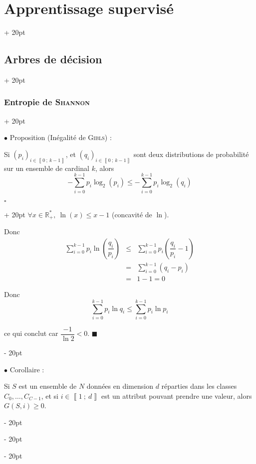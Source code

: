 \documentclass[a4paper, 12pt, twoside]{article}
\newcommand{\R}{\mathbb{R}} %
\newcommand{\nset}[2]{\left\llbracket #1\ ;\ #2 \right\rrbracket}
\newcommand{\lr}[1]{\left( #1 \right)}
\renewcommand{\le}{\leqslant}
\renewcommand{\ge}{\geqslant}
\newcommand{\ind}[1][20pt]{\advance\leftskip + #1}
\newcommand{\deind}[1][20pt]{\advance\leftskip - #1}
\newenvironment{indt}[2][20pt]{#2 \par \ind[#1]}{\par \deind} %
\newenvironment{proof}[1][{}]{\begin{indt}{$\square$ #1}}{$\blacksquare$ \end{indt}}
\begin{document}
\begin{indt}{\section{Apprentissage supervisé}}
\begin{indt}{\subsection{Arbres de décision}}
\begin{indt}{\subsubsection{Entropie de \textsc{Shannon}}}
                \vspace{12pt}
                
                $\bullet$ Proposition (Inégalité de \textsc{Gibls}) :
                \begin{emphBox}
                    Si $\lr{p_i}_{i \in \nset 0 {k - 1}}$, et $\lr{q_i}_{i \in \nset 0 {k - 1}}$ sont deux distributions de probabilité sur un ensemble de cardinal $k$, alors
                    \[
                        -\sum_{i = 0}^{k - 1} p_i \log_2(p_i)
                        \le
                        -\sum_{i = 0}^{k - 1} p_i \log_2(q_i)
                    \]
                \end{emphBox}

                \vspace{6pt}
                
                \begin{proof}
                    $\forall x \in \R^*_+,\ \ln(x) \le x - 1$ (concavité de $\ln$).

                    Donc
                    \[
                        \begin{array}{rcl}
                            \displaystyle
                            \sum_{i = 0}^{k - 1} p_i \ln\!\lr{\dfrac{q_i}{p_i}}
                            &\le& \displaystyle
                            \sum_{i = 0}^{k - 1} p_i \lr{\dfrac{q_i}{p_i} - 1}
                            \\
                            &=& \displaystyle
                            \sum_{i = 0}^{k - 1} (q_i - p_i)
                            \\
                            &=& 1 - 1 = 0
                        \end{array}
                    \]

                    Donc
                    \[
                        \sum_{i = 0}^{k - 1} p_i \ln q_i
                        \le
                        \sum_{i = 0}^{k - 1} p_i \ln p_i
                    \]

                    ce qui conclut car $\dfrac{-1}{\ln 2} < 0$.
                \end{proof}

                \vspace{12pt}
                
                $\bullet$ Corollaire :
                \begin{emphBox}
                    Si $S$ est un ensemble de $N$ données en dimension $d$ réparties dans les classes $C_0, \ldots, C_{C - 1}$, et si $i \in \nset 1 d$ est un attribut pouvant prendre une valeur, alors $G(S, i) \ge 0$.
                \end{emphBox}


\end{indt}
\end{indt}
\end{indt}
\end{document}
